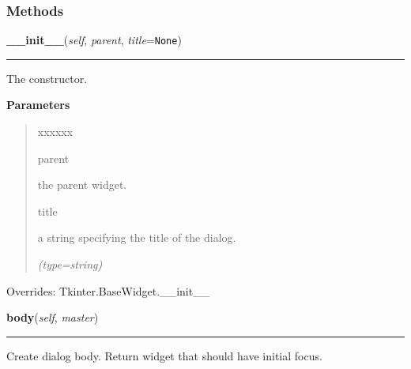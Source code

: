   \subsubsection{Methods}

    \vspace{0.5ex}

\hspace{.8\funcindent}\begin{boxedminipage}{\funcwidth}

    \raggedright \textbf{\_\_init\_\_}(\textit{self}, \textit{parent}, \textit{title}={\tt None})

    \vspace{-1.5ex}

    \rule{\textwidth}{0.5\fboxrule}
\setlength{\parskip}{2ex}
    The constructor.

\setlength{\parskip}{1ex}
      \textbf{Parameters}
      \vspace{-1ex}

      \begin{quote}
        \begin{Ventry}{xxxxxx}

          \item[parent]

          the parent widget.

          \item[title]

          a string specifying the title of the dialog.

            {\it (type=string)}

        \end{Ventry}

      \end{quote}

      Overrides: Tkinter.BaseWidget.\_\_init\_\_

    \end{boxedminipage}

    \label{nMOLDYN:GUI:GeneralInformationsDialog:GeneralInformationsDialog:body}

    \vspace{0.5ex}

\hspace{.8\funcindent}\begin{boxedminipage}{\funcwidth}

    \raggedright \textbf{body}(\textit{self}, \textit{master})

    \vspace{-1.5ex}

    \rule{\textwidth}{0.5\fboxrule}
\setlength{\parskip}{2ex}
    Create dialog body. Return widget that should have initial focus.

\setlength{\parskip}{1ex}
    \end{boxedminipage}

